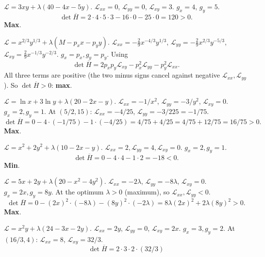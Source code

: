 \begin{solutions}
  \item $\mathcal{L} = 3 x y + \lambda(40 - 4 x - 5 y)$.
        $\mathcal{L}_{xx} = 0$, $\mathcal{L}_{yy} = 0$,
        $\mathcal{L}_{xy} = 3$. $g_x = 4$, $g_y = 5$.
        \[\det \overline{H} = 2 \cdot 4 \cdot 5 \cdot 3 - 16 \cdot 0
        - 25 \cdot 0 = 120 > 0.\] \textbf{Max}. \checkmark
  \item $\mathcal{L} = x^{2/3} y^{1/3} + \lambda(M - p_x x - p_y y)$.
        $\mathcal{L}_{xx} = -\tfrac{2}{9} x^{-4/3} y^{1/3}$,
        $\mathcal{L}_{yy} = -\tfrac{2}{9} x^{2/3} y^{-5/3}$,
        $\mathcal{L}_{xy} = \tfrac{2}{9} x^{-1/3} y^{-2/3}$.
        $g_x = p_x, g_y = p_y$. Using
        \[\det \overline{H} = 2 p_x p_y \mathcal{L}_{xy}
        - p_x^2 \mathcal{L}_{yy} - p_y^2 \mathcal{L}_{xx}.\]
        All three terms are positive (the two minus signs cancel against
        negative $\mathcal{L}_{xx}, \mathcal{L}_{yy}$). So
        $\det \overline{H} > 0$: \textbf{max}. \checkmark
  \item $\mathcal{L} = \ln x + 3 \ln y + \lambda(20 - 2 x - y)$.
        $\mathcal{L}_{xx} = -1/x^2$, $\mathcal{L}_{yy} = -3/y^2$,
        $\mathcal{L}_{xy} = 0$. $g_x = 2, g_y = 1$. At $(5/2, 15)$:
        $\mathcal{L}_{xx} = -4/25$,
        $\mathcal{L}_{yy} = -3/225 = -1/75$.
        \[\det \overline{H} = 0 - 4 \cdot (-1/75) - 1 \cdot (-4/25)
        = 4/75 + 4/25 = 4/75 + 12/75 = 16/75 > 0.\] \textbf{Max}.
        \checkmark
  \item $\mathcal{L} = x^2 + 2 y^2 + \lambda(10 - 2 x - y)$.
        $\mathcal{L}_{xx} = 2, \mathcal{L}_{yy} = 4,
        \mathcal{L}_{xy} = 0$. $g_x = 2, g_y = 1$.
        \[\det \overline{H} = 0 - 4 \cdot 4 - 1 \cdot 2 = -18 < 0.\]
        \textbf{Min}. \checkmark
  \item $\mathcal{L} = 5 x + 2 y + \lambda(20 - x^2 - 4 y^2)$.
        $\mathcal{L}_{xx} = -2 \lambda$, $\mathcal{L}_{yy} = -8 \lambda$,
        $\mathcal{L}_{xy} = 0$. $g_x = 2 x, g_y = 8 y$. At the optimum
        $\lambda > 0$ (maximum), so
        $\mathcal{L}_{xx}, \mathcal{L}_{yy} < 0$.
        \[\det \overline{H} = 0 - (2 x)^2 \cdot (-8 \lambda)
        - (8 y)^2 \cdot (-2 \lambda)
        = 8 \lambda (2 x)^2 + 2 \lambda (8 y)^2 > 0.\] \textbf{Max}.
        \checkmark
  \item $\mathcal{L} = x^2 y + \lambda(24 - 3 x - 2 y)$.
        $\mathcal{L}_{xx} = 2 y$, $\mathcal{L}_{yy} = 0$,
        $\mathcal{L}_{xy} = 2 x$. $g_x = 3, g_y = 2$. At $(16/3, 4)$:
        $\mathcal{L}_{xx} = 8$, $\mathcal{L}_{xy} = 32/3$.
        \[\det \overline{H} = 2 \cdot 3 \cdot 2 \cdot (32/3)
\]
\end{solutions}
